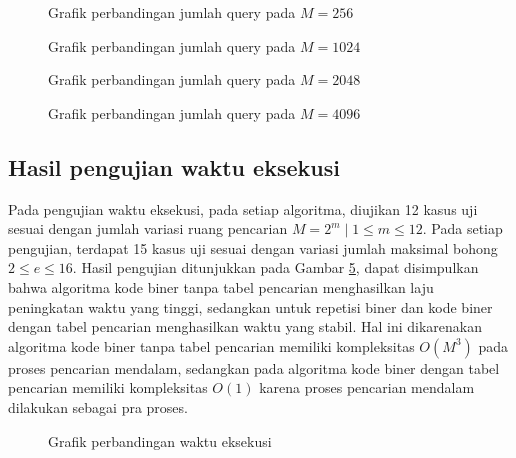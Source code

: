 \begin{figure}
\centering
{}
\caption{Grafik perbandingan jumlah query pada $M=256$}
\label{fig:graph_query8}
\end{figure}


\begin{figure}
\centering
{}
\caption{Grafik perbandingan jumlah query pada $M=1024$}
\label{fig:graph_query10}
\end{figure}

\begin{figure}
\centering
{}
\caption{Grafik perbandingan jumlah query pada $M=2048$}
\label{fig:graph_query11}
\end{figure}

\begin{figure}
\centering
{}
\caption{Grafik perbandingan jumlah query pada $M=4096$}
\label{fig:graph_query12}
\end{figure}

\subsection{Hasil pengujian waktu eksekusi}

Pada pengujian waktu eksekusi, pada setiap algoritma, diujikan 12 kasus uji sesuai dengan jumlah variasi ruang pencarian $M = 2^m \mid 1 \leq m \leq 12$. Pada setiap pengujian, terdapat 15 kasus uji sesuai dengan variasi jumlah maksimal bohong $2 \leq e \leq 16$. Hasil pengujian ditunjukkan pada Gambar \ref{fig:graph_time}, dapat disimpulkan bahwa algoritma kode biner tanpa tabel pencarian menghasilkan laju peningkatan waktu yang tinggi, sedangkan untuk repetisi biner dan kode biner dengan tabel pencarian menghasilkan waktu yang stabil. Hal ini dikarenakan algoritma kode biner tanpa tabel pencarian memiliki kompleksitas $O(M^3)$ pada proses pencarian mendalam, sedangkan pada algoritma kode biner dengan tabel pencarian memiliki kompleksitas $O(1)$ karena proses pencarian mendalam dilakukan sebagai pra proses.

\begin{figure}
\centering
{}
\caption{Grafik perbandingan waktu eksekusi}
\label{fig:graph_time}
\end{figure}

